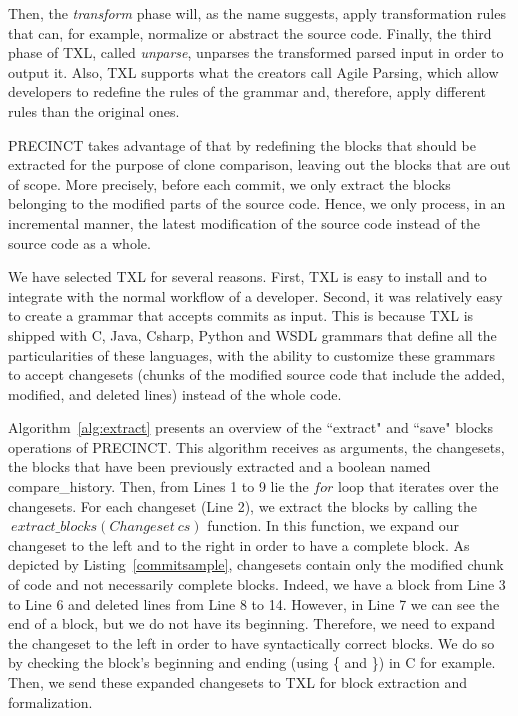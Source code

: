 \documentclass[conference]{IEEEtran}
\begin{document}
Then, the \textit{transform} phase will, as the name suggests, apply transformation rules that can, for example, normalize or abstract the source code. Finally, the third phase of TXL,  called \textit{unparse}, unparses the transformed parsed input in order to output it.
Also, TXL supports what the creators call Agile Parsing\cite{Dean}, which allow developers to redefine the rules of the grammar and, therefore, apply different rules than the original ones.


PRECINCT takes advantage of that by redefining the blocks that should be extracted for the purpose of clone comparison, leaving out the  blocks that are out of scope.
More precisely, before each commit, we only extract the blocks belonging to the modified parts of the source code.
Hence, we only process, in an incremental manner, the latest modification of the source code instead of the source code as a whole.

We have selected TXL for several reasons. First, TXL is easy to install and to integrate with the normal workflow of a developer.
Second, it was relatively easy to create a grammar that accepts commits as input.
This is because TXL is shipped with C, Java, Csharp, Python and WSDL grammars that define all the particularities of these languages, with the ability to customize these grammars to accept changesets (chunks of the modified source code that include the added, modified, and deleted lines) instead of the whole code.



Algorithm~\ref{alg:extract} presents an overview of the ``extract" and ``save" blocks operations of PRECINCT. This algorithm receives as arguments, the changesets, the blocks that have been previously extracted and a boolean named compare\_history.
Then, from Lines 1 to 9 lie the $for$ loop that iterates over the changesets. For each changeset (Line 2), we extract the blocks by calling the $~extract\_blocks(Changeset~cs)$ function.
In this function, we expand our changeset to the left and to the right in order to have a complete block.
As depicted by Listing~\ref{commitsample}, changesets contain only the modified chunk of code and not necessarily complete blocks. Indeed, we have a block from Line 3 to Line 6 and deleted lines from Line 8 to 14.
However, in Line 7 we can see the end of a block, but we do not have its beginning. Therefore, we need to expand the changeset to the left in order to have syntactically correct blocks.
We do so by checking the block's beginning and ending (using \{ and \}) in C for example.
Then, we send these expanded changesets to TXL for block extraction and formalization.
\end{document}
